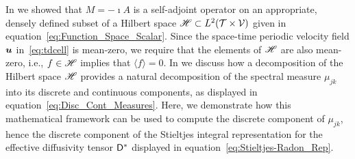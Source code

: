 \documentclass[amsa]{ipart}
\begin{document}
In  we showed that $M=-\imath A$ is a
self-adjoint operator on an appropriate, densely defined subset of a
Hilbert space $\mathscr{H}\subset L^2(\mathcal{T}\times\mathcal{V})$ given in
equation~\eqref{eq:Function_Space_Scalar}. Since the space-time
periodic velocity field $\boldsymbol{u}$ 
in~\eqref{eq:tdcell} is mean-zero, we require that the elements of
$\mathscr{H}$ are also mean-zero, i.e., $f\in\mathscr{H}$ implies that $\langle f\rangle=0$. In
 we discuss how a decomposition of the
Hilbert space $\mathscr{H}$ provides a natural decomposition of the spectral
measure $\mu_{jk}$ into its discrete and continuous components, as
displayed in equation~\eqref{eq:Disc_Cont_Measures}. Here, we
demonstrate how this mathematical framework can be used to compute the
discrete component of $\mu_{jk}$, hence the discrete component of the
Stieltjes integral representation for the effective diffusivity tensor
$\mathsf{D}^*$ displayed in equation~\eqref{eq:Stieltjes-Radon_Rep}.
\end{document}
